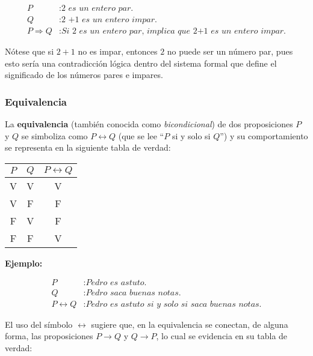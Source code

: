 \begin{equation*}
    \begin{split}
        P &: \textit{2 es un entero par.} \\
        Q &: \textit{2 +1 es un entero impar.} \\
        P \Rightarrow Q &: \textit{Si 2 es un entero par, implica que 2+1 es un entero impar.}
    \end{split}
\end{equation*}

Nótese que si $2+1$ no es impar, entonces $2$ no puede ser un número par, pues esto sería una contradicción lógica dentro del sistema formal que define el significado de los números pares e impares.

\subsubsection{Equivalencia}

La \textbf{equivalencia} (también conocida como \textit{bicondicional}) de dos proposiciones $P$ y $Q$ se simboliza como $P \leftrightarrow Q$ (que se lee ``$P$ si y solo si $Q$'') y su comportamiento se representa en la siguiente tabla de verdad:

\begin{center}
    \begin{tabular}{c|c|c}
        $P$ & $Q$ & $P \leftrightarrow Q$  \\
        \hline
        V & V & V \\
        V & F & F \\
        F & V & F \\
        F & F & V
    \end{tabular}
    \label{tab:bicondicional-tabla}
\end{center}

\textbf{Ejemplo:}

\begin{equation*}
    \begin{split}
        P &: \textit{Pedro es astuto.} \\
        Q &: \textit{Pedro saca buenas notas.} \\
        P \leftrightarrow Q &: \textit{Pedro es astuto si y solo si saca buenas notas.}
    \end{split}
\end{equation*}

El uso del símbolo $\leftrightarrow$ sugiere que, en la equivalencia se conectan, de alguna forma, las proposiciones $P \rightarrow Q$  y $Q \rightarrow P$, lo cual se evidencia en su tabla de verdad:

